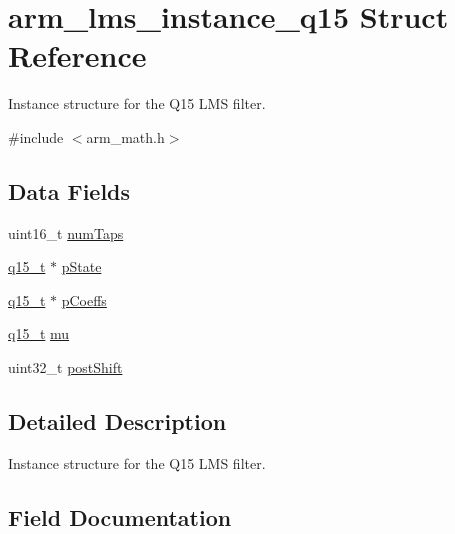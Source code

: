 \hypertarget{structarm__lms__instance__q15}{}\section{arm\+\_\+lms\+\_\+instance\+\_\+q15 Struct Reference}
\label{structarm__lms__instance__q15}


Instance structure for the Q15 L\+MS filter.  




{\ttfamily \#include $<$arm\+\_\+math.\+h$>$}

\subsection*{Data Fields}
\begin{DoxyCompactItemize}
\item 
uint16\+\_\+t \mbox{\hyperlink{structarm__lms__instance__q15_a751941891e47f522a7f5375fe8990aac}{num\+Taps}}
\item 
\mbox{\hyperlink{arm__math_8h_ab5a8fb21a5b3b983d5f54f31614052ea}{q15\+\_\+t}} $\ast$ \mbox{\hyperlink{structarm__lms__instance__q15_ae29dfdb736374fcddaeaec4b7770170c}{p\+State}}
\item 
\mbox{\hyperlink{arm__math_8h_ab5a8fb21a5b3b983d5f54f31614052ea}{q15\+\_\+t}} $\ast$ \mbox{\hyperlink{structarm__lms__instance__q15_a7ca181a37f714d174445f486bebce26f}{p\+Coeffs}}
\item 
\mbox{\hyperlink{arm__math_8h_ab5a8fb21a5b3b983d5f54f31614052ea}{q15\+\_\+t}} \mbox{\hyperlink{structarm__lms__instance__q15_aab4745770bd667de040227eec1b5ff8d}{mu}}
\item 
uint32\+\_\+t \mbox{\hyperlink{structarm__lms__instance__q15_aa2cacddfc5e1d86905d7d31a18b1979b}{post\+Shift}}
\end{DoxyCompactItemize}


\subsection{Detailed Description}
Instance structure for the Q15 L\+MS filter. 

\subsection{Field Documentation}
\mbox{\label{structarm__lms__instance__q15_aab4745770bd667de040227eec1b5ff8d}} 
